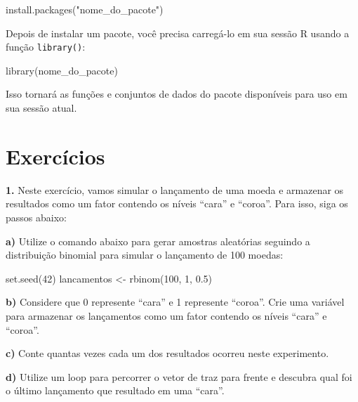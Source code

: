 \documentclass[
  portuguese,
  letterpaper,
  DIV=11,
  numbers=noendperiod]{scrreprt}
\newenvironment{Shaded}{\begin{snugshade}}{\end{snugshade}}
\newcommand{\DecValTok}[1]{\textcolor[rgb]{0.68,0.00,0.00}{#1}}
\newcommand{\FloatTok}[1]{\textcolor[rgb]{0.68,0.00,0.00}{#1}}
\newcommand{\FunctionTok}[1]{\textcolor[rgb]{0.28,0.35,0.67}{#1}}
\newcommand{\NormalTok}[1]{\textcolor[rgb]{0.00,0.23,0.31}{#1}}
\newcommand{\OtherTok}[1]{\textcolor[rgb]{0.00,0.23,0.31}{#1}}
\newcommand{\StringTok}[1]{\textcolor[rgb]{0.13,0.47,0.30}{#1}}
\theoremstyle{definition}
\theoremstyle{remark}
\begin{document}
\begin{Shaded}
\begin{Highlighting}[]
\FunctionTok{install.packages}\NormalTok{(}\StringTok{"nome\_do\_pacote"}\NormalTok{)}
\end{Highlighting}
\end{Shaded}

Depois de instalar um pacote, você precisa carregá-lo em sua sessão R
usando a função \texttt{library()}:

\begin{Shaded}
\begin{Highlighting}[]
\FunctionTok{library}\NormalTok{(nome\_do\_pacote)}
\end{Highlighting}
\end{Shaded}

Isso tornará as funções e conjuntos de dados do pacote disponíveis para
uso em sua sessão atual.

\section{Exercícios}\label{exercuxedcios-1}

\textbf{1.} Neste exercício, vamos simular o lançamento de uma moeda e
armazenar os resultados como um fator contendo os níveis ``cara'' e
``coroa''. Para isso, siga os passos abaixo:

\textbf{a)} Utilize o comando abaixo para gerar amostras aleatórias
seguindo a distribuição binomial para simular o lançamento de 100
moedas:

\begin{Shaded}
\begin{Highlighting}[]
\FunctionTok{set.seed}\NormalTok{(}\DecValTok{42}\NormalTok{)}
\NormalTok{lancamentos }\OtherTok{\textless{}{-}} \FunctionTok{rbinom}\NormalTok{(}\DecValTok{100}\NormalTok{, }\DecValTok{1}\NormalTok{, }\FloatTok{0.5}\NormalTok{)}
\end{Highlighting}
\end{Shaded}

\textbf{b)} Considere que 0 represente ``cara'' e 1 represente
``coroa''. Crie uma variável para armazenar os lançamentos como um fator
contendo os níveis ``cara'' e ``coroa''.

\textbf{c)} Conte quantas vezes cada um dos resultados ocorreu neste
experimento.

\textbf{d)} Utilize um loop para percorrer o vetor de traz para frente e
descubra qual foi o último lançamento que resultado em uma ``cara''.
\end{document}
